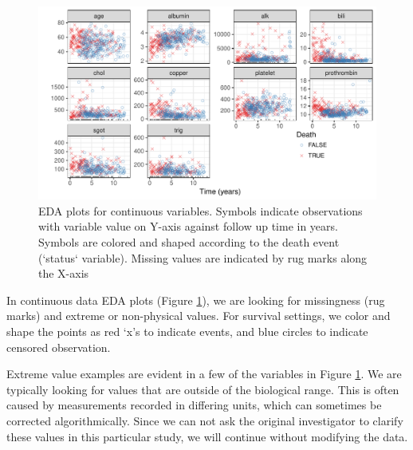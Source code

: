 \documentclass[article, nojss]{jss}
\begin{document}
\begin{Schunk}
\begin{figure}[!htb]

{\centering \includegraphics{rfs-continuousEDA-1}

}

\caption[EDA plots for continuous variables]{EDA plots for continuous variables. Symbols indicate observations with variable value on Y-axis against follow up time in years. Symbols are colored and shaped according to the death event  (`status` variable). Missing values are indicated by rug marks along the X-axis}\label{fig:continuousEDA}
\end{figure}
\end{Schunk}

In continuous data EDA plots (Figure \ref{fig:continuousEDA}), we are
looking for missingness (rug marks) and extreme or non-physical values.
For survival settings, we color and shape the points as red `x's to
indicate events, and blue circles to indicate censored observation.

Extreme value examples are evident in a few of the variables in Figure
\ref{fig:continuousEDA}. We are typically looking for values that are
outside of the biological range. This is often caused by measurements
recorded in differing units, which can sometimes be corrected
algorithmically. Since we can not ask the original investigator to
clarify these values in this particular study, we will continue without
modifying the data.
\end{document}
